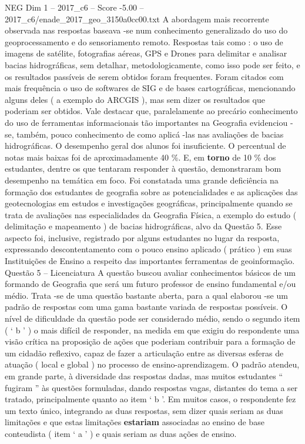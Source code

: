 \begin{textsample}{NEG Dim 1 – 2017\_c6 – Score -5.00 – 2017\_c6/enade\_2017\_geo\_3150a0cc00.txt}
A abordagem mais recorrente observada nas respostas baseava -se num conhecimento generalizado do uso do geoprocessamento e do sensoriamento remoto.
Respostas tais como : o uso de imagens de satélite, fotografias aéreas, GPS e Drones para delimitar e analisar bacias hidrográficas, sem detalhar, metodologicamente, como isso pode ser feito, e os resultados passíveis de serem obtidos foram frequentes.
Foram citados com mais frequência o uso de softwares de SIG e de bases cartográficas, mencionando alguns deles ( a exemplo do ARCGIS ), mas sem dizer os resultados que poderiam ser obtidos.
Vale destacar que, paralelamente ao precário conhecimento do uso de ferramentas informacionais tão importantes na Geografia evidenciou -se, também, pouco conhecimento de como aplicá -las nas avaliações de bacias hidrográficas.
O desempenho geral dos alunos foi insuficiente.
O percentual de notas mais baixas foi de aproximadamente 40 \%.
E, em \textbf{torno} de 10 \% dos estudantes, dentre os que tentaram responder à questão, demonstraram bom desempenho na temática em foco.
Foi constatada uma grande deficiência na formação dos estudantes de geografia sobre as potencialidades e as aplicações das geotecnologias em estudos e investigações geográficas, principalmente quando se trata de avaliações nas especialidades da Geografia Física, a exemplo do estudo ( delimitação e mapeamento ) de bacias hidrográficas, alvo da Questão 5.
Esse aspecto foi, inclusive, registrado por alguns estudantes no lugar da resposta, expressando descontentamento com o pouco ensino aplicado ( prático ) em suas Instituições de Ensino a respeito das importantes ferramentas de geoinformação.
Questão 5 – Licenciatura A questão buscou avaliar conhecimentos básicos de um formando de Geografia que será um futuro professor de ensino fundamental e/ou médio.
Trata -se de uma questão bastante aberta, para a qual elaborou -se um padrão de respostas com uma gama bastante variada de respostas possíveis.
O nível de dificuldade da questão pode ser considerado médio, sendo o segundo item ( ‘ b ’ ) o mais difícil de responder, na medida em que exigiu do respondente uma visão crítica na proposição de ações que poderiam contribuir para a formação de um cidadão reflexivo, capaz de fazer a articulação entre as diversas esferas de atuação ( local e global ) no processo de ensino-aprendizagem.
O padrão atendeu, em grande parte, à diversidade das respostas dadas, mas muitos estudantes “ fugiram ” às questões formuladas, dando respostas vagas, distantes do tema a ser tratado, principalmente quanto ao item ‘ b ’.
Em muitos casos, o respondente fez um texto único, integrando as duas respostas, sem dizer quais seriam as duas limitações e que estas limitações \textbf{estariam} associadas ao ensino de base conteudista ( item ‘ a ’ ) e quais seriam as duas ações de ensino.

\end{textsample}
